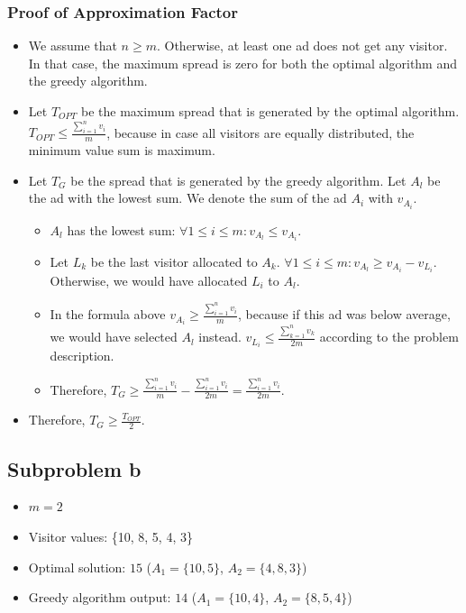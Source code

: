 \documentclass[12pt]{article}
\begin{document}
\subsubsection*{Proof of Approximation Factor}
\begin{itemize}
	\item We assume that $n \geq m$. Otherwise, at least one ad does not get any visitor. In that case, the maximum spread is zero for both the optimal algorithm and the greedy algorithm.
	\item Let $T_\mathit{OPT}$ be the maximum spread that is generated by the optimal algorithm. $T_\mathit{OPT} \leq \frac{\sum_{i=1}^n v_i}{m}$, because in case all visitors are equally distributed, the minimum value sum is maximum.
	\item Let $T_G$ be the spread that is generated by the greedy algorithm. Let $A_l$ be the ad with the lowest sum. We denote the sum of the ad $A_i$ with $v_{A_i}$.
	\begin{itemize}
		\item $A_l$ has the lowest sum: $\forall 1 \leq i \leq m: v_{A_l} \leq v_{A_i}$.
		\item Let $L_k$ be the last visitor allocated to $A_k$. $\forall 1 \leq i \leq m: v_{A_l} \geq v_{A_i} - v_{L_i}$. Otherwise, we would have allocated $L_i$ to $A_l$.
		\item In the formula above $v_{A_i} \geq \frac{\sum_{i=1}^n v_i}{m}$, because if this ad was below average, we would have selected $A_l$ instead. $v_{L_i} \leq \frac{\sum_{k=1}^n v_k}{2m}$ according to the problem description.
		\item Therefore, $T_G \geq \frac{\sum_{i=1}^n v_i}{m} - \frac{\sum_{i=1}^n v_i}{2m} = \frac{\sum_{i=1}^n v_i}{2m}$.
	\end{itemize}
	\item Therefore, $T_G \geq \frac{T_\mathit{OPT}}{2}$.
\end{itemize}

\subsection*{Subproblem b}
\begin{itemize}
	\item $m=2$
	\item Visitor values: \{10, 8, 5, 4, 3\}
	\item Optimal solution: $15$ ($A_1 = \{10, 5\}$, $A_2= \{4,8,3\}$)
	\item Greedy algorithm output: $14$ ($A_1 = \{10, 4\}$, $A_2 = \{8,5,4\}$)
\end{itemize}
\end{document}
